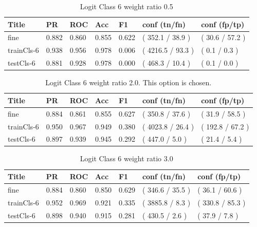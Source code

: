 \documentclass[ms]{nuthesis}
\begin{document}
\FloatBarrier
\begin{table}[H]
\centering
\caption{Logit Class 6 weight ratio 0.5}
\label{tab:LogRegCls6-Wtp5}
\begin{tabular}{|l||l||l||l||l||l||l|}\toprule
Title & PR & ROC & Acc & F1 & conf (tn/fn) & conf (fp/tp) \\ \midrule
fine & 0.882 & 0.860 & 0.855 & 0.622 & ( 352.1 / 38.9 ) & ( 30.6 / 57.2 ) \\
trainCls-6 & 0.938 & 0.956 & 0.978 & 0.006 & ( 4216.5 / 93.3 ) & ( 0.1 / 0.3 ) \\
testCls-6 & 0.881 & 0.928 & 0.978 & 0.000 & ( 468.3 / 10.4 ) & ( 0.1 / 0.0 ) \\ \bottomrule
\end{tabular}
\end{table}
\FloatBarrier


\FloatBarrier
\begin{table}[H]
\centering
\caption{Logit Class 6 weight ratio 2.0. This option is chosen.}
\label{tab:LogRegCls6-Wt2}
\begin{tabular}{|l||l||l||l||l||l||l|}\toprule
Title & PR & ROC & Acc & F1 & conf (tn/fn) & conf (fp/tp) \\ \midrule
fine & 0.884 & 0.861 & 0.855 & 0.627 & ( 350.8 / 37.6 ) & ( 31.9 / 58.5 ) \\
trainCls-6 & 0.950 & 0.967 & 0.949 & 0.380 & ( 4023.8 / 26.4 ) & ( 192.8 / 67.2 ) \\
testCls-6 & 0.897 & 0.939 & 0.945 & 0.292 & ( 447.0 / 5.0 ) & ( 21.4 / 5.4 ) \\ \bottomrule
\end{tabular}
\end{table}
\FloatBarrier

\FloatBarrier
\begin{table}[H]
\centering
\caption{Logit Class 6 weight ratio 3.0}
\label{tab:LogRegCls6-Wt3}
\begin{tabular}{|l||l||l||l||l||l||l|}\toprule
Title & PR & ROC & Acc & F1 & conf (tn/fn) & conf (fp/tp) \\ \midrule
fine & 0.884 & 0.860 & 0.850 & 0.629 & ( 346.6 / 35.5 ) & ( 36.1 / 60.6 ) \\
trainCls-6 & 0.952 & 0.969 & 0.921 & 0.335 & ( 3885.8 / 8.3 ) & ( 330.8 / 85.3 ) \\
testCls-6 & 0.898 & 0.940 & 0.915 & 0.281 & ( 430.5 / 2.6 ) & ( 37.9 / 7.8 ) \\ \bottomrule
\end{tabular}
\end{table}
\FloatBarrier
\end{document}
